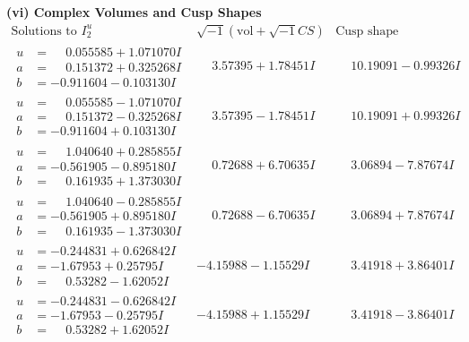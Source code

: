 \documentclass[1p]{elsarticle_modified}
\theoremstyle{definition}
\newcommand{\I}{\sqrt{-1}}
\begin{document}
\newpage\flushleft \textbf{(vi) Complex Volumes and Cusp Shapes}
$$\begin{array}{c|c|c}  
\text{Solutions to }I^u_{2}& \I (\text{vol} + \sqrt{-1}CS) & \text{Cusp shape}\\
 \hline 
\begin{aligned}
u &= \phantom{-}0.055585 + 1.071070 I \\
a &= \phantom{-}0.151372 + 0.325268 I \\
b &= -0.911604 - 0.103130 I\end{aligned}
 & \phantom{-}3.57395 + 1.78451 I & \phantom{-}10.19091 - 0.99326 I \\ \hline\begin{aligned}
u &= \phantom{-}0.055585 - 1.071070 I \\
a &= \phantom{-}0.151372 - 0.325268 I \\
b &= -0.911604 + 0.103130 I\end{aligned}
 & \phantom{-}3.57395 - 1.78451 I & \phantom{-}10.19091 + 0.99326 I \\ \hline\begin{aligned}
u &= \phantom{-}1.040640 + 0.285855 I \\
a &= -0.561905 - 0.895180 I \\
b &= \phantom{-}0.161935 + 1.373030 I\end{aligned}
 & \phantom{-}0.72688 + 6.70635 I & \phantom{-}3.06894 - 7.87674 I \\ \hline\begin{aligned}
u &= \phantom{-}1.040640 - 0.285855 I \\
a &= -0.561905 + 0.895180 I \\
b &= \phantom{-}0.161935 - 1.373030 I\end{aligned}
 & \phantom{-}0.72688 - 6.70635 I & \phantom{-}3.06894 + 7.87674 I \\ \hline\begin{aligned}
u &= -0.244831 + 0.626842 I \\
a &= -1.67953 + 0.25795 I \\
b &= \phantom{-}0.53282 - 1.62052 I\end{aligned}
 & -4.15988 - 1.15529 I & \phantom{-}3.41918 + 3.86401 I \\ \hline\begin{aligned}
u &= -0.244831 - 0.626842 I \\
a &= -1.67953 - 0.25795 I \\
b &= \phantom{-}0.53282 + 1.62052 I\end{aligned}
 & -4.15988 + 1.15529 I & \phantom{-}3.41918 - 3.86401 I \\ \hline\begin{aligned}

\end{aligned}
\end{array}$$
\end{document}
